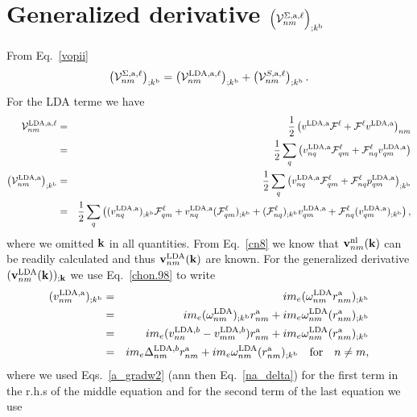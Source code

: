 \documentclass[floatfix,prb,aps,superscriptaddress,11pt,preprint]{revtex4}
\begin{document}
\section{Generalized derivative 
$\Big({\cal V}^{\Sigma,\mathrm{a},\ell}_{nm}\Big)_{;k^{\mathrm{b}}}$}\label{calvs} 
From Eq.~\eqref{vopii} %
\begin{eqnarray}\label{a.1}
\left(
{\mathbf{\cal V}}^{\Sigma,\mathrm{a},\ell}_{nm}
\right)_{;k^{\mathrm{b}}}
=
\left(
{\mathbf{\cal V}}^{\mathrm{LDA},\mathrm{a},\ell}_{nm}
\right)_{;k^{\mathrm{b}}}
+
\left(
{\mathbf{\cal V}}^{S,\mathrm{a},\ell}_{nm}
\right)_{;k^{\mathrm{b}}}
.
\end{eqnarray}
For the LDA terme we have
\begin{eqnarray}\label{a.2}
{\mathbf{\cal V}}^{\mathrm{LDA},\mathrm{a},\ell}_{nm}
&=&
\frac{1}{2}\left(
v^{\mathrm{LDA},\mathrm{a}}{\mathbf{\cal F}}^\ell+{\mathbf{\cal F}}^\ell v^{\mathrm{LDA},\mathrm{a}}
\right)_{nm}
\nonumber\\
&=&
\frac{1}{2}\sum_q\left(
v^{\mathrm{LDA},\mathrm{a}}_{nq}{\mathbf{\cal F}}^\ell_{qm}+{\mathbf{\cal F}}^\ell_{nq} v^{\mathrm{LDA},\mathrm{a}}_{qm}
\right)
\nonumber\\
\left({\mathbf{\cal V}}^{\mathrm{LDA},\mathrm{a}}_{nm}\right)_{;k^{\mathrm{b}}}
&=&
\frac{1}{2}\sum_q\left(
v^{\mathrm{LDA},\mathrm{a}}_{nq}{\mathbf{\cal F}}^\ell_{qm}+{\mathbf{\cal F}}^\ell_{nq} p^{\mathrm{LDA},\mathrm{a}}_{qm}
\right) _{;k^{\mathrm{b}}}
\nonumber\\
&=&
\frac{1}{2}\sum_q\left(
(v^{\mathrm{LDA},\mathrm{a}}_{nq})_{;k^{\mathrm{b}}}{\mathbf{\cal F}}^\ell_{qm}
+ 
v^{\mathrm{LDA},\mathrm{a}}_{nq}({\mathbf{\cal F}}^\ell_{qm})_{;k^{\mathrm{b}}}
+
({\mathbf{\cal F}}^\ell_{nq})_{;k^{\mathrm{b}}} v^{\mathrm{LDA},\mathrm{a}}_{qm}
+
{\mathbf{\cal F}}^\ell_{nq} (v^{\mathrm{LDA},\mathrm{a}}_{qm})_{;k^{\mathrm{b}}}
\right)
,
\end{eqnarray} 
where we omitted $\mathbf{k}$ in all quantities.
From Eq.~\eqref{cn8} we know that $\mathbf{v}^{\mathrm{nl}}_{nm}(\mathbf{k})$
 can be readily
calculated and thus 
$\mathbf{v}^{\mathrm{LDA}}_{nm}(\mathbf{k})$ are known.
For the generalized derivative 
$(\mathbf{v}^{\mathrm{LDA}}_{nm}(\mathbf{k}))_{;\mathbf{k}}$ we use Eq.~\eqref{chon.98}
to write
\begin{eqnarray}\label{a.3}
(v^{\mathrm{LDA},\mathrm{a}}_{nm})_{;k^{\mathrm{b}}}
&=& 
im_e(\omega^{\mathrm{LDA}}_{nm}r^{\mathrm{a}}_{nm})_{;k^{\mathrm{b}}}
\nonumber\\
&=& 
im_e(\omega^{\mathrm{LDA}}_{nm})_{;k^{\mathrm{b}}} r^{\mathrm{a}}_{nm}
+ 
im_e\omega^{\mathrm{LDA}}_{nm}(r^{\mathrm{a}}_{nm})_{;k^{\mathrm{b}}}
\nonumber\\
&=& 
im_e(v^{\mathrm{LDA},b}_{nn}-v^{\mathrm{LDA},b}_{mm})r^{\mathrm{a}}_{nm}
+ 
im_e\omega^{\mathrm{LDA}}_{nm}(r^{\mathrm{a}}_{nm})_{;k^{\mathrm{b}}}
\nonumber\\
&=& 
im_e\Delta^{\mathrm{LDA},b}_{nm}r^{\mathrm{a}}_{nm}
+ 
im_e\omega^{\mathrm{LDA}}_{nm}(r^{\mathrm{a}}_{nm})_{;k^{\mathrm{b}}}
\quad\mathrm{for}\quad n\ne m
,
\end{eqnarray} 
where we used Eqs.~\eqref{a_gradw2} (ann then Eq.~\eqref{na_delta})
 for the first term in the r.h.s
of the middle equation
and for the second term of the last equation we use
\end{document}
